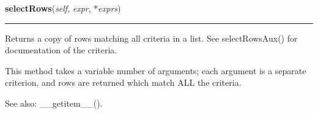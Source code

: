     \label{Classes:DotData:DotData:selectRows}

    \vspace{0.5ex}

\hspace{.8\funcindent}\begin{boxedminipage}{\funcwidth}

    \raggedright \textbf{selectRows}(\textit{self}, \textit{expr}, *\textit{exprs})

    \vspace{-1.5ex}

    \rule{\textwidth}{0.5\fboxrule}
\setlength{\parskip}{2ex}
    Returns a copy of rows matching all criteria in a list.  See 
    selectRowsAux() for documentation of the criteria.

    This method takes a variable number of arguments; each argument is a 
    separate criterion, and rows are returned which match ALL the criteria.

    See also: \_\_getitem\_\_().

\setlength{\parskip}{1ex}
    \end{boxedminipage}

    \label{Classes:DotData:DotData:__getitem__}

    \vspace{0.5ex}

